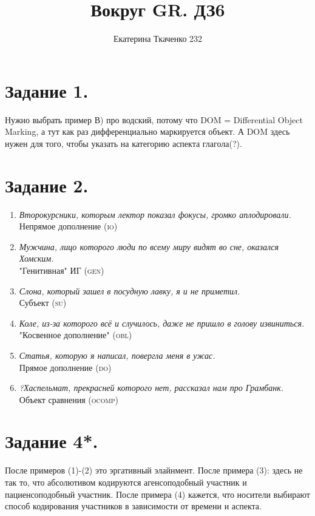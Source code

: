\documentclass[16pt]{article}
\title{Вокруг GR. ДЗ6}
\author{Екатерина Ткаченко 232}
\begin{document}
\maketitle

\section*{Задание 1.}
Нужно выбрать пример В) про водский, потому что DOM = Differential Object Marking, а тут как раз дифференциально маркируется объект. А DOM здесь нужен для того, чтобы указать на категорию аспекта глагола(?).

\section*{Задание 2.}
\begin{enumerate}
\item \textit{Второкурсники, которым лектор показал фокусы, громко аплодировали.}\\
Непрямое дополнение (\textsc{io})

\item \textit{Мужчина, лицо которого люди по всему миру видят во сне, оказался Хомским.}\\
"Генитивная" ИГ (\textsc{gen})

\item \textit{Слона, который зашел в посудную лавку, я и не приметил.}\\
Субъект (\textsc{su})

\item \textit{Коле, из-за которого всё и случилось, даже не пришло в голову извиниться.}\\
"Косвенное дополнение" (\textsc{obl})

\item \textit{Статья, которую я написал, повергла меня в ужас.}\\
Прямое дополнение (\textsc{do})

\item \textit{?Хаспельмат, прекрасней которого нет, рассказал нам про Грамбанк.}\\
Объект сравнения (\textsc{ocomp})
\end{enumerate}

\section*{Задание 4*.}
После примеров (1)-(2) это эргативный элайнмент. После примера (3): здесь не так то, что абсолютивом кодируются агенсоподобный участник и пациенсоподобный участник. После примера (4) кажется, что носители выбирают способ кодирования участников в зависимости от времени и аспекта.
\end{document}
